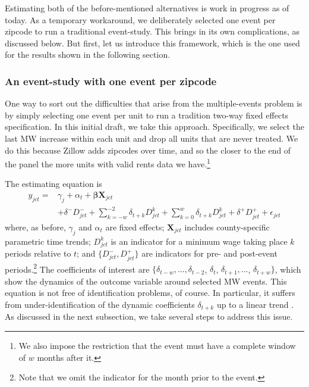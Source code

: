     Estimating both of the before-mentioned alternatives is work in progress as of today. As a temporary workaround, we deliberately selected one event per zipcode to run a traditional event-study. This brings in its own complications, as discussed below. But first, let us introduce this framework, which is the one used for the results shown in the following section.

\subsubsection{An event-study with one event per zipcode}

    One way to sort out the difficulties that arise from the multiple-events problem is by simply selecting one event per unit to run a tradition two-way fixed effects specification. In this initial draft, we take this approach. Specifically, we select the last MW increase within each unit and drop all units that are never treated. We do this because Zillow adds zipcodes over time, and so the closer to the end of the panel the more units with valid rents data we have.\footnote{We also impose the restriction that the event must have a complete window of $w$ months after it.}
    
    The estimating equation is
    \begin{equation}\label{eq:last-event-study}
        \begin{split}
            y_{jct} = & \gamma_{j} + \alpha_{t} + \boldsymbol{\beta} \boldsymbol{X}_{jct} \\
            & + \delta^{-} D_{jct}^{-} + \sum\limits_{k = -w}^{-2}\delta_{t + k}D_{jct}^k + \sum\limits_{k = 0}^{w}\delta_{t + k} D_{jct}^k + \delta^{+} D_{jct}^{+} + \epsilon_{jct} 
        \end{split}   
    \end{equation}
    where, as before, $\gamma_{j}$ and $\alpha_{t}$ are fixed effects; $\boldsymbol{X}_{jct}$ includes county-specific parametric time trends; $D_{jct}^k$ is an indicator for a minimum wage taking place $k$ periods relative to $t$; and $\{D_{jct}^{-}, D_{jct}^{+}\}$ are indicators for pre- and post-event periods.\footnote{Note that we omit the indicator for the month prior to the event.} The coefficients of interest are $\{\delta_{t-w}, ..., \delta_{t-2}$, $\delta_t$, $\delta_{t+1}, ...$, $\delta_{t+w}\}$, which show the dynamics of the outcome variable around selected MW events. This equation is not free of identification problems, of course. In particular, it suffers from under-identification of the dynamic coefficients $\delta_{t+k}$ up to a linear trend \parencite{borusyak2017revisiting}. As discussed in the next subsection, we take several steps to address this issue.
    
